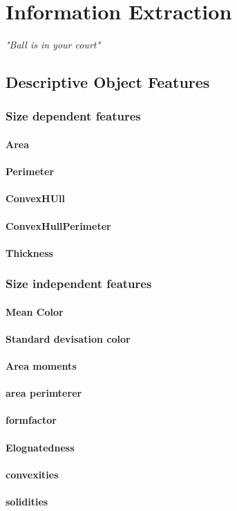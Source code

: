 \chapter{Information Extraction}
\begin{center}
\vspace{-6ex}
\textit{"Ball is in your court"}
\vspace{6ex}
\end{center}

\section{Descriptive Object Features}

\subsection{Size dependent features}
\subsubsection{Area}
\subsubsection{Perimeter}
\subsubsection{ConvexHUll}
\subsubsection{ConvexHullPerimeter}
\subsubsection{Thickness}

\subsection{Size independent features}
\subsubsection{Mean Color}
\subsubsection{Standard devisation color}
\subsubsection{Area moments}
\subsubsection{area perimterer}
\subsubsection{formfactor}
\subsubsection{Elognatedness}
\subsubsection{convexities}
\subsubsection{solidities}
